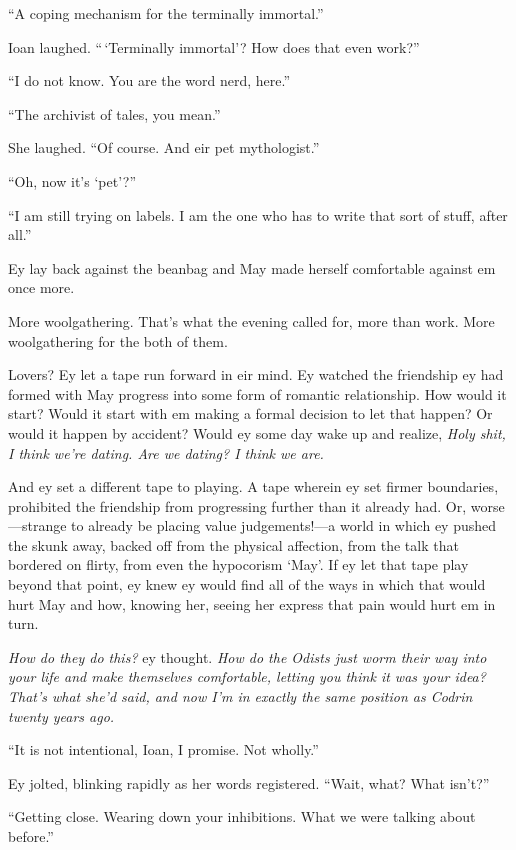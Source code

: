 ``A coping mechanism for the terminally immortal.''

Ioan laughed. ``\,`Terminally immortal'? How does that even work?''

``I do not know. You are the word nerd, here.''

``The archivist of tales, you mean.''

She laughed. ``Of course. And eir pet mythologist.''

``Oh, now it's `pet'?''

``I am still trying on labels. I am the one who has to write that sort of stuff, after all.''

Ey lay back against the beanbag and May made herself comfortable against em once more.

More woolgathering. That's what the evening called for, more than work. More woolgathering for the both of them.

Lovers? Ey let a tape run forward in eir mind. Ey watched the friendship ey had formed with May progress into some form of romantic relationship. How would it start? Would it start with em making a formal decision to let that happen? Or would it happen by accident? Would ey some day wake up and realize, \emph{Holy shit, I think we're dating. Are we dating? I think we are.}

And ey set a different tape to playing. A tape wherein ey set firmer boundaries, prohibited the friendship from progressing further than it already had. Or, worse---strange to already be placing value judgements!---a world in which ey pushed the skunk away, backed off from the physical affection, from the talk that bordered on flirty, from even the hypocorism `May'. If ey let that tape play beyond that point, ey knew ey would find all of the ways in which that would hurt May and how, knowing her, seeing her express that pain would hurt em in turn.

\emph{How do they do this?} ey thought. \emph{How do the Odists just worm their way into your life and make themselves comfortable, letting you think it was your idea? That's what she'd said, and now I'm in exactly the same position as Codrin twenty years ago.}

``It is not intentional, Ioan, I promise. Not wholly.''

Ey jolted, blinking rapidly as her words registered. ``Wait, what? What isn't?''

``Getting close. Wearing down your inhibitions. What we were talking about before.''

